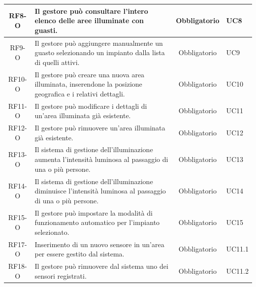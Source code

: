 \documentclass[a4paper, 12pt]{article}
\begin{document}
\begin{longtable}{|c|p{7cm}|c|p{4cm}|}
    \hline
    RF8-O           & Il gestore può consultare l'intero elenco delle aree illuminate con guasti.                                                                                   & Obbligatorio       & UC8            \\
    \hline
    RF9-O           & Il gestore può aggiungere manualmente un guasto selezionando un impianto dalla lista di quelli attivi.                                                        & Obbligatorio       & UC9            \\
    \hline
    RF10-O          & Il gestore può creare una nuova area illuminata, inserendone la posizione geografica e i relativi dettagli.                                                   & Obbligatorio       & UC10           \\
    \hline
    RF11-O          & Il gestore può modificare i dettagli di un'area illuminata già esistente.                                                                                     & Obbligatorio       & UC11           \\
    \hline
    RF12-O          & Il gestore può rimuovere un'area illuminata già esistente.                                                                                                    & Obbligatorio       & UC12           \\
    \hline
    RF13-O          & Il sistema di gestione dell'illuminazione aumenta l'intensità luminosa al passaggio di una o più persone.                                                     & Obbligatorio       & UC13           \\
    \hline
    RF14-O          & Il sistema di gestione dell'illuminazione diminuisce l'intensità luminosa al passaggio di una o più persone.                                                  & Obbligatorio       & UC14           \\
    \hline
    RF15-O          & Il gestore può impostare la modalità di funzionamento automatico per l'impianto selezionato.                                                                  & Obbligatorio       & UC15           \\
    \hline
    RF17-O          & Inserimento di un nuovo sensore in un'area per essere gestito dal sistema.                                                                                    & Obbligatorio       & UC11.1         \\
    \hline
    RF18-O          & Il gestore può rimuovere dal sistema uno dei sensori registrati.                                                                                              & Obbligatorio       & UC11.2         \\

\end{longtable}
\end{document}
